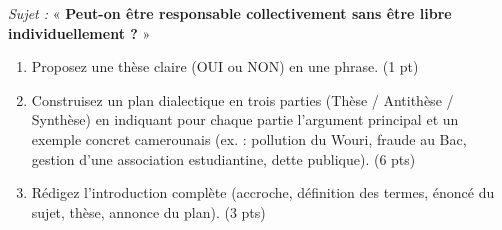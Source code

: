 \documentclass[11pt]{article}
\begin{document}
\begin{exercice}
    \textit{Sujet :} « \textbf{Peut-on être responsable collectivement sans être libre individuellement ?} »
    \begin{enumerate}
        \item Proposez une thèse claire (OUI ou NON) en une phrase. (1 pt)
        \item Construisez un plan dialectique en trois parties (Thèse / Antithèse / Synthèse) en indiquant pour chaque partie l'argument principal et un exemple concret camerounais (ex. : pollution du Wouri, fraude au Bac, gestion d'une association estudiantine, dette publique). (6 pts)
        \item Rédigez l'introduction complète (accroche, définition des termes, énoncé du sujet, thèse, annonce du plan). (3 pts)
    \end{enumerate}
\end{exercice}
\end{document}
